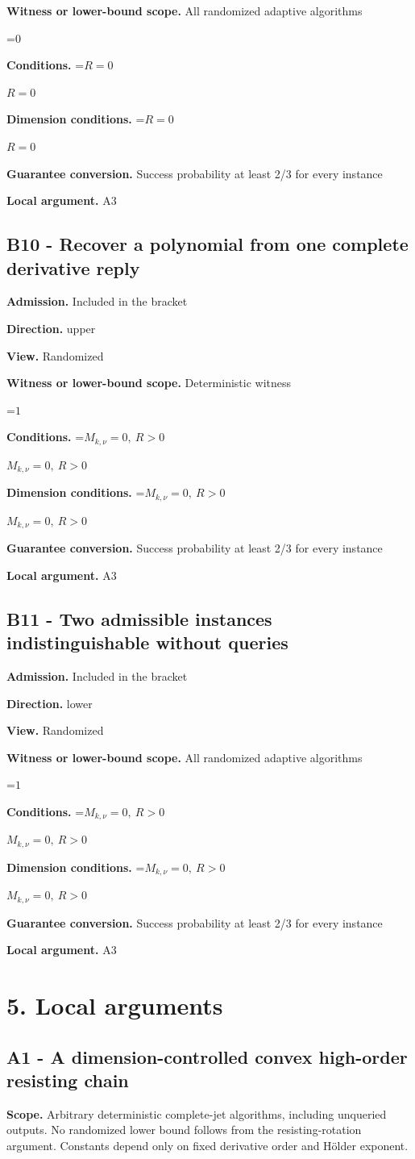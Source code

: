 \documentclass[10pt,a4paper]{article}
\newcommand{\AtlasMath}[1]{\par\begingroup\centering\setbox0=\hbox{$\displaystyle #1$}\ifdim\wd0>1.4\linewidth\typeout{ATLAS WIDE FORMULA: \the\wd0}\fi\ifdim\wd0>\linewidth\resizebox{\linewidth}{!}{\box0}\else\box0\fi\par\endgroup}
\newcommand{\AtlasInlineMath}[1]{\begingroup\setbox0=\hbox{$#1$}\ifdim\wd0>.4\linewidth\endgroup\AtlasMath{#1}\else\endgroup$#1$\fi}
\begin{document}
\textbf{Witness or lower-bound scope.} All randomized adaptive algorithms

\AtlasMath{0}
\textbf{Conditions.} \AtlasInlineMath{R=0}

\textbf{Dimension conditions.} \AtlasInlineMath{R=0}

\textbf{Guarantee conversion.} Success probability at least 2/3 for every instance

\textbf{Local argument.} A3

\subsection{B10 - Recover a polynomial from one complete derivative reply}
\textbf{Admission.} Included in the bracket

\textbf{Direction.} upper

\textbf{View.} Randomized

\textbf{Witness or lower-bound scope.} Deterministic witness

\AtlasMath{1}
\textbf{Conditions.} \AtlasInlineMath{M_{k,\nu}=0,\ R>0}

\textbf{Dimension conditions.} \AtlasInlineMath{M_{k,\nu}=0,\ R>0}

\textbf{Guarantee conversion.} Success probability at least 2/3 for every instance

\textbf{Local argument.} A3

\subsection{B11 - Two admissible instances indistinguishable without queries}
\textbf{Admission.} Included in the bracket

\textbf{Direction.} lower

\textbf{View.} Randomized

\textbf{Witness or lower-bound scope.} All randomized adaptive algorithms

\AtlasMath{1}
\textbf{Conditions.} \AtlasInlineMath{M_{k,\nu}=0,\ R>0}

\textbf{Dimension conditions.} \AtlasInlineMath{M_{k,\nu}=0,\ R>0}

\textbf{Guarantee conversion.} Success probability at least 2/3 for every instance

\textbf{Local argument.} A3

\section{5. Local arguments}
\subsection{A1 - A dimension-controlled convex high-order resisting chain}
\textbf{Scope.} Arbitrary deterministic complete-jet algorithms, including unqueried outputs. No randomized lower bound follows from the resisting-rotation argument. Constants depend only on fixed derivative order and Hölder exponent.
\end{document}
